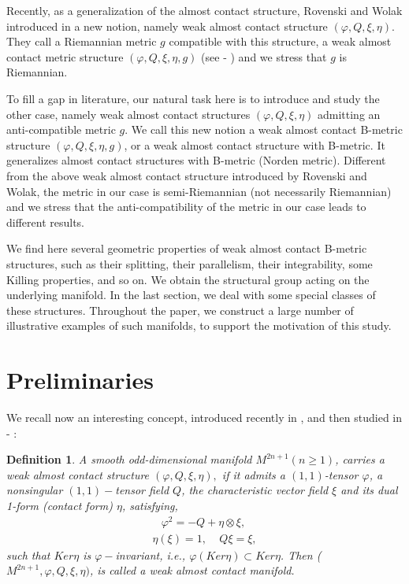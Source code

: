 \documentclass{article}
\newtheorem{definition}[theorem]{Definition}
\begin{document}
\noindent Recently, as a generalization of the almost contact structure, Rovenski and Wolak introduced in \cite{Rovenski1} a new notion, namely weak almost contact structure $(\varphi,Q,\xi,\eta)$. They call a Riemannian metric $g$ compatible with this structure, a weak almost contact metric structure $(\varphi,Q,\xi,\eta,g)$ (see \cite{Rovenski1} - \cite{Rovenski3}) and we stress that $g$ is Riemannian. \medskip

\noindent  To fill a gap in literature, our natural task here is to introduce and study the other case, namely weak almost contact structures $(\varphi,Q,\xi,\eta)$ admitting an anti-compatible metric $g$. We call this new notion a weak almost contact B-metric structure $(\varphi,Q,\xi,\eta,g)$, or a weak almost contact structure with B-metric. It generalizes almost contact structures with B-metric (Norden metric). Different from the above weak almost contact structure introduced by Rovenski and Wolak, the metric in our case is semi-Riemannian (not necessarily Riemannian) and we stress that the anti-compatibility of the metric in our case leads to different results. \medskip

\noindent We find here several geometric properties of weak almost contact B-metric structures, such as their splitting, their parallelism, their integrability, some Killing properties, and so on. We obtain the structural group acting on the underlying manifold. In the last section, we deal with some special classes of these structures. Throughout the paper, we construct a large number of illustrative examples of such manifolds, to support the motivation of this study.  \medskip


\section{Preliminaries}

We recall now an interesting concept, introduced recently in \cite{Rovenski1}, and then studied in \cite{Rovenski5} -  \cite{Rovenski3}:\medskip

\begin{definition} \label{d1}\cite{Rovenski1}
	A smooth odd-dimensional manifold $M^{2n+1} (n\geq 1)$, carries a \textit{weak almost contact structure} $(\varphi,Q,\xi,\eta),$ if it admits a $(1,1)$-tensor $\varphi$, a nonsingular $(1,1)-$tensor field $Q$, the characteristic vector field $\xi$ and its dual 1-form (contact form) $\eta$, satisfying,
	\begin{eqnarray}
		\varphi^2=-Q+\eta\otimes \xi, \ \label{eq1}
	\end{eqnarray}
	\begin{eqnarray}
		\eta(\xi)=1, \ \ \ \ \ Q\xi=\xi,   \label{eq1a}
	\end{eqnarray}
	such that $Ker\eta$ is $\varphi-$invariant, i.e., $\varphi(Ker\eta)\subset Ker\eta$. Then ($M^{2n+1}, \varphi,Q,\xi,\eta)$, is called a weak almost contact manifold.
\end{definition}
\end{document}
